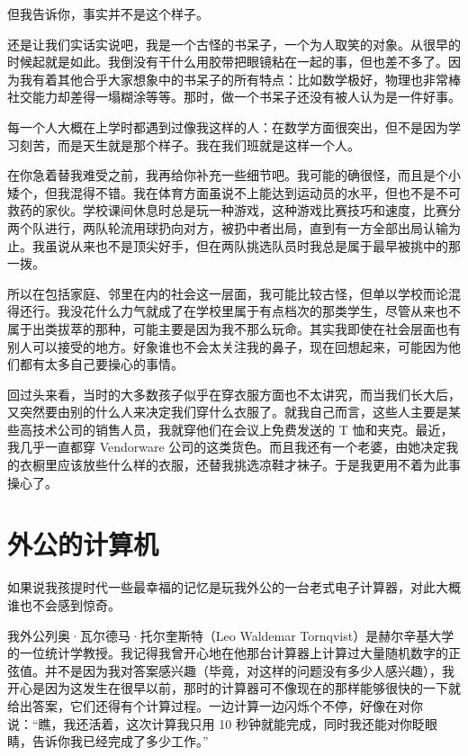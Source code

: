 但我告诉你，事实并不是这个样子。

还是让我们实话实说吧，我是一个古怪的书呆子，一个为人取笑的对象。从很早的时候起就是如此。我倒没有干什么用胶带把眼镜粘在一起的事，但也差不多了。因为我有着其他合乎大家想象中的书呆子的所有特点：比如数学极好，物理也非常棒社交能力却差得一塌糊涂等等。那时，做一个书呆子还没有被人认为是一件好事。

每一个人大概在上学时都遇到过像我这样的人：在数学方面很突出，但不是因为学习刻苦，而是天生就是那个样子。我在我们班就是这样一个人。

在你急着替我难受之前，我再给你补充一些细节吧。我可能的确很怪，而且是个小矮个，但我混得不错。我在体育方面虽说不上能达到运动员的水平，但也不是不可救药的家伙。学校课间休息时总是玩一种游戏，这种游戏比赛技巧和速度，比赛分两个队进行，两队轮流用球扔向对方，被扔中者出局，直到有一方全部出局认输为止。我虽说从来也不是顶尖好手，但在两队挑选队员时我总是属于最早被挑中的那一拨。

所以在包括家庭、邻里在内的社会这一层面，我可能比较古怪，但单以学校而论混得还行。我没花什么力气就成了在学校里属于有点档次的那类学生，尽管从来也不属于出类拔萃的那种，可能主要是因为我不那么玩命。其实我即使在社会层面也有别人可以接受的地方。好象谁也不会太关注我的鼻子，现在回想起来，可能因为他们都有太多自己要操心的事情。

回过头来看，当时的大多数孩子似乎在穿衣服方面也不太讲究，而当我们长大后，又突然要由别的什么人来决定我们穿什么衣服了。就我自己而言，这些人主要是某些高技术公司的销售人员，我就穿他们在会议上免费发送的 T 恤和夹克。最近，我几乎一直都穿 Vendorware 公司的这类货色。而且我还有一个老婆，由她决定我的衣橱里应该放些什么样的衣服，还替我挑选凉鞋才袜子。于是我更用不着为此事操心了。

 

 
\section{外公的计算机}

如果说我孩提时代一些最幸福的记忆是玩我外公的一台老式电子计算器，对此大概谁也不会感到惊奇。

我外公列奥·瓦尔德马·托尔奎斯特（Leo Waldemar Tornqvist）是赫尔辛基大学的一位统计学教授。我记得我曾开心地在他那台计算器上计算过大量随机数字的正弦值。并不是因为我对答案感兴趣（毕竟，对这样的问题没有多少人感兴趣），我开心是因为这发生在很早以前，那时的计算器可不像现在的那样能够很快的一下就给出答案，它们还得有个计算过程。一边计算一边闪烁个不停，好像在对你说：“瞧，我还活着，这次计算我只用 10 秒钟就能完成，同时我还能对你眨眼睛，告诉你我已经完成了多少工作。”

